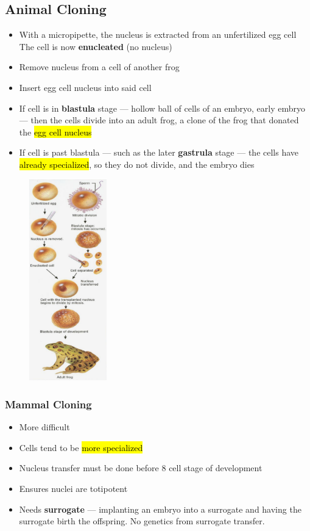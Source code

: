 \documentclass[a4paper,12pt]{article}
\begin{document}
\subsection{Animal Cloning}
\begin{itemize}
    \item{With a micropipette, the nucleus is extracted from an unfertilized egg cell\\The cell is now \textbf{enucleated} (no nucleus)}
    \item{Remove nucleus from a cell of another frog}
    \item{Insert egg cell nucleus into said cell}
    \item{If cell is in \textbf{blastula} stage --- hollow ball of cells of an embryo, early embryo --- then the cells divide into an adult frog, a clone of the frog that donated the \hl{egg cell nucleus}}
    \item{If cell is past blastula --- such as the later \textbf{gastrula} stage --- the cells have \hl{already specialized}, so they do not divide, and the embryo dies}
\end{itemize}

\begin{figure}[H]
    \centering
    \includegraphics[width=0.3\textwidth]{clone}
\end{figure}

\subsubsection{Mammal Cloning}
\begin{itemize}
    \item{More difficult}
    \item{Cells tend to be \hl{more specialized}}
    \item{Nucleus transfer must be done before 8 cell stage of development}
    \item{Ensures nuclei are totipotent}
    \item{Needs \textbf{surrogate} --- implanting an embryo into a surrogate and having the surrogate birth the offspring. No genetics from surrogate transfer.}
\end{itemize}
\end{document}
